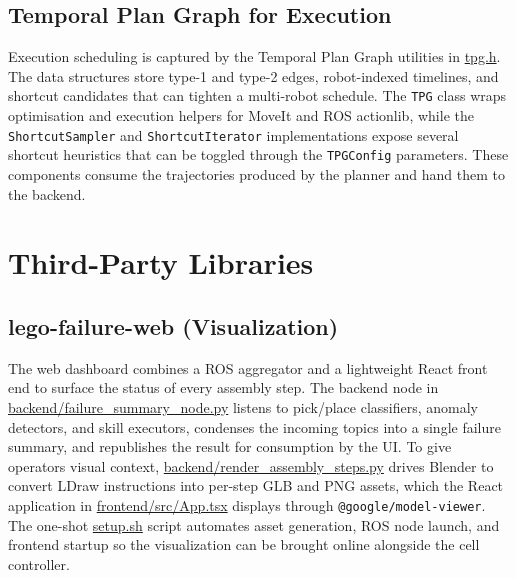 \documentclass{article}
\begin{document}
\subsection{Temporal Plan Graph for Execution}
Execution scheduling is captured by the Temporal Plan Graph utilities in \href{https://github.com/intelligent-control-lab/AIDF/blob/main/planner/include/tpg.h#L1}{tpg.h}. The data structures store type-1 and type-2 edges, robot-indexed timelines, and shortcut candidates that can tighten a multi-robot schedule. The \texttt{TPG} class wraps optimisation and execution helpers for MoveIt and ROS actionlib, while the \texttt{ShortcutSampler} and \texttt{ShortcutIterator} implementations expose several shortcut heuristics that can be toggled through the \texttt{TPGConfig} parameters. These components consume the trajectories produced by the planner and hand them to the backend.

\section{Third-Party Libraries}
\subsection{lego-failure-web (Visualization)}
The web dashboard combines a ROS aggregator and a lightweight React front end to surface the status of every assembly step. The backend node in \href{https://github.com/intelligent-control-lab/AIDF/blob/main/tools/lego-failure-web/backend/failure_summary_node.py#L1}{backend/failure\_summary\_node.py} listens to pick/place classifiers, anomaly detectors, and skill executors, condenses the incoming topics into a single failure summary, and republishes the result for consumption by the UI. To give operators visual context, \href{https://github.com/intelligent-control-lab/AIDF/blob/main/tools/lego-failure-web/backend/render_assembly_steps.py#L1}{backend/render\_assembly\_steps.py} drives Blender to convert LDraw instructions into per-step GLB and PNG assets, which the React application in \href{https://github.com/intelligent-control-lab/AIDF/blob/main/tools/lego-failure-web/frontend/src/App.tsx}{frontend/src/App.tsx} displays through \texttt{@google/model-viewer}. The one-shot \href{https://github.com/intelligent-control-lab/AIDF/blob/main/tools/lego-failure-web/setup.sh}{setup.sh} script automates asset generation, ROS node launch, and frontend startup so the visualization can be brought online alongside the cell controller.
\end{document}
